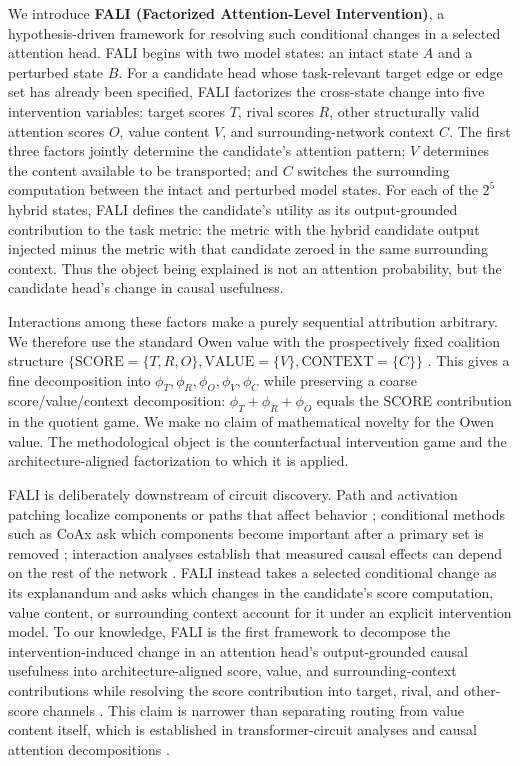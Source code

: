 \documentclass[pdflatex,sn-mathphys-ay]{sn-jnl}
\begin{document}
We introduce \textbf{FALI (Factorized Attention-Level Intervention)}, a hypothesis-driven framework for resolving such conditional changes in a selected attention head. FALI begins with two model states: an intact state $A$ and a perturbed state $B$. For a candidate head whose task-relevant target edge or edge set has already been specified, FALI factorizes the cross-state change into five intervention variables: target scores $T$, rival scores $R$, other structurally valid attention scores $O$, value content $V$, and surrounding-network context $C$. The first three factors jointly determine the candidate's attention pattern; $V$ determines the content available to be transported; and $C$ switches the surrounding computation between the intact and perturbed model states. For each of the $2^5$ hybrid states, FALI defines the candidate's utility as its output-grounded contribution to the task metric: the metric with the hybrid candidate output injected minus the metric with that candidate zeroed in the same surrounding context. Thus the object being explained is not an attention probability, but the candidate head's change in causal usefulness.

Interactions among these factors make a purely sequential attribution arbitrary. We therefore use the standard Owen value with the prospectively fixed coalition structure $\{\mathrm{SCORE}=\{T,R,O\},\mathrm{VALUE}=\{V\},\mathrm{CONTEXT}=\{C\}\}$ \citep{owen1977values}. This gives a fine decomposition into $\phi_T,\phi_R,\phi_O,\phi_V,\phi_C$ while preserving a coarse score/value/context decomposition: $\phi_T+\phi_R+\phi_O$ equals the SCORE contribution in the quotient game. We make no claim of mathematical novelty for the Owen value. The methodological object is the counterfactual intervention game and the architecture-aligned factorization to which it is applied.

FALI is deliberately downstream of circuit discovery. Path and activation patching localize components or paths that affect behavior \citep{goldowskydill2023pathpatching,zhang2024activationpatching,heimersheim2024activationpatching}; conditional methods such as CoAx ask which components become important after a primary set is removed \citep{gong2026coax}; interaction analyses establish that measured causal effects can depend on the rest of the network \citep{vaidyanathan2026curse}. FALI instead takes a selected conditional change as its explanandum and asks which changes in the candidate's score computation, value content, or surrounding context account for it under an explicit intervention model. To our knowledge, FALI is the first framework to decompose the intervention-induced change in an attention head's output-grounded causal usefulness into architecture-aligned score, value, and surrounding-context contributions while resolving the score contribution into target, rival, and other-score channels \citep{gong2026coax,vaidyanathan2026curse,wang2026fewshot,zhu2026lexical}. This claim is narrower than separating routing from value content itself, which is established in transformer-circuit analyses and causal attention decompositions \citep{elhage2021mathematical,franco2025attentioncausal,wang2026fewshot}.
\end{document}
